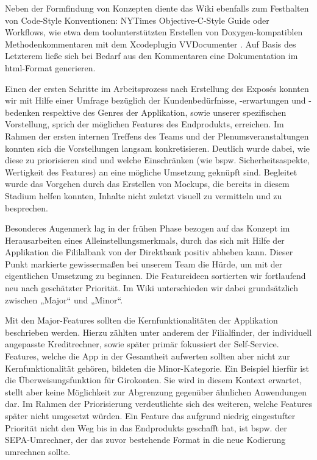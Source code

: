 	Neben der Formfindung von Konzepten diente das Wiki ebenfalls zum Festhalten von Code-Style Konventionen: NYTimes Objective-C-Style Guide \citep{NYStyleGuide14} oder Workflows, wie etwa dem toolunterstützten Erstellen von Doxygen-kompatiblen Methodenkommentaren mit dem Xcodeplugin VVDocumenter \citep{Wang14}. Auf Basis des Letzterem ließe sich bei Bedarf aus den Kommentaren eine Dokumentation im html-Format generieren. 

	Einen der ersten Schritte im Arbeitsprozess nach Erstellung des Exposés konnten wir mit Hilfe einer Umfrage bezüglich der Kundenbedürfnisse, -erwartungen und -bedenken respektive des Genres der Applikation, sowie unserer spezifischen Vorstellung, sprich der möglichen Features des Endprodukts, erreichen. Im Rahmen der ersten internen Treffens des Teams und der Plenumsveranstaltungen konnten sich die Vorstellungen langsam konkretisieren. Deutlich wurde dabei, wie diese zu priorisieren sind und welche Einschränken (wie bspw. Sicherheitsaspekte, Wertigkeit des Features) an eine mögliche Umsetzung geknüpft sind. Begleitet wurde das Vorgehen durch das Erstellen von Mockups, die bereits in diesem Stadium helfen konnten, Inhalte nicht zuletzt visuell zu vermitteln und zu besprechen.

	Besonderes Augenmerk lag in der frühen Phase bezogen auf das Konzept im Herausarbeiten eines Alleinstellungsmerkmals, durch das sich mit Hilfe der Applikation die Fililalbank von der Direktbank positiv abheben kann. Dieser Punkt markierte gewissermaßen bei unserem Team die Hürde, um mit der eigentlichen Umsetzung zu beginnen. Die Featureideen sortierten wir fortlaufend neu nach geschätzter Priorität. Im Wiki unterschieden wir dabei grundsätzlich zwischen „Major“ und „Minor“.  
	
	Mit den Major-Features sollten die Kernfunktionalitäten der Applikation beschrieben werden. Hierzu zählten unter anderem der Filialfinder, der individuell angepasste Kreditrechner, sowie später primär fokussiert der Self-Service. Features, welche die App in der Gesamtheit aufwerten sollten aber nicht zur Kernfunktionalität gehören, bildeten die Minor-Kategorie. Ein Beispiel hierfür ist die Überweisungsfunktion für Girokonten. Sie wird in diesem Kontext erwartet, stellt aber keine Möglichkeit zur Abgrenzung gegenüber ähnlichen Anwendungen dar. Im Rahmen der Priorisierung verdeutlichte sich des weiteren, welche Features später nicht umgesetzt würden. Ein Feature das aufgrund niedrig eingestufter Priorität nicht den Weg bis in das Endprodukts geschafft hat, ist bspw. der SEPA-Umrechner, der das zuvor bestehende Format in die neue Kodierung umrechnen sollte. 
	
